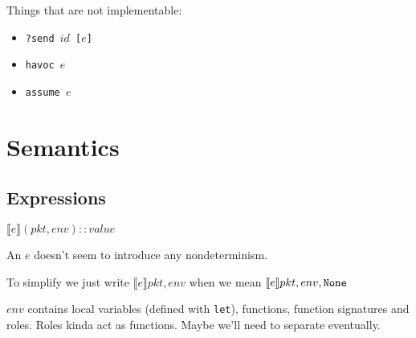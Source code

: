 \documentclass{report}
\newcommand\sem[1]{\llbracket #1\rrbracket}
\newcommand{\pkt}{\ensuremath{pkt}}
\newcommand{\env}{\ensuremath{env}}
\begin{document}
Things that are not implementable:
%
\begin{itemize}

\item \texttt{?send $id$ [$e$]}
\item \texttt{havoc $e$}
\item \texttt{assume $e$}

\end{itemize}

\section{Semantics}
\subsection{Expressions}
$\sem{e}(\pkt,\env) :: value$

An $e$ doesn't seem to introduce any nondeterminism.


To simplify we just write $\sem{e}\pkt,\env$ when we mean $\sem{e}\pkt,\env,{\tt None}$

$\env$ contains local variables (defined with \texttt{let}), functions, function signatures and
roles. Roles kinda act as functions. Maybe we'll need to separate eventually.
\end{document}

